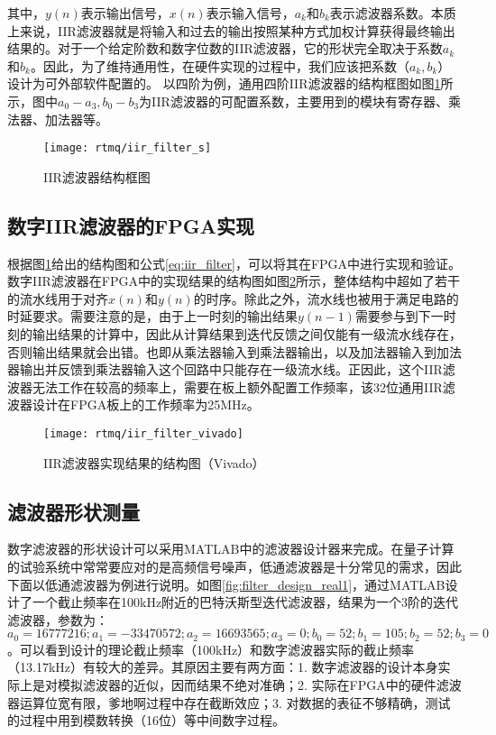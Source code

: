 
其中，$y(n)$表示输出信号，$x(n)$表示输入信号，$a_k$和$b_k$表示滤波器系数。本质上来说，IIR滤波器就是将输入和过去的输出按照某种方式加权计算获得最终输出结果的。对于一个给定阶数和数字位数的IIR滤波器，它的形状完全取决于系数$a_k$和$b_k$。因此，为了维持通用性，在硬件实现的过程中，我们应该把系数（$a_k, b_k$）设计为可外部软件配置的。
以四阶为例，通用四阶IIR滤波器的结构框图如图\ref{fig:iir_filter_s}所示，图中$a_0-a_3, b_0-b_3$为IIR滤波器的可配置系数，主要用到的模块有寄存器、乘法器、加法器等。
\begin{figure}
    \centering
    \caption[IIR滤波器结构框图]{IIR滤波器结构框图\label{fig:iir_filter_s}}
    \texttt{[image: rtmq/iir\_filter\_s]}
\end{figure}


\subsection[数字IIR滤波器的FPGA实现]{数字IIR滤波器的FPGA实现}

根据图\ref{fig:iir_filter_s}给出的结构图和公式\eqref{eq:iir_filter}，可以将其在FPGA中进行实现和验证。数字IIR滤波器在FPGA中的实现结果的结构图如图\ref{fig:iir_filter_vivado}所示，整体结构中超如了若干的流水线用于对齐$x(n)$和$y(n)$的时序。除此之外，流水线也被用于满足电路的时延要求。需要注意的是，由于上一时刻的输出结果$y(n-1)$需要参与到下一时刻的输出结果的计算中，因此从计算结果到迭代反馈之间仅能有一级流水线存在，否则输出结果就会出错。也即从乘法器输入到乘法器输出，以及加法器输入到加法器输出并反馈到乘法器输入这个回路中只能存在一级流水线。正因此，这个IIR滤波器无法工作在较高的频率上，需要在板上额外配置工作频率，该32位通用IIR滤波器设计在FPGA板上的工作频率为25MHz。

\begin{figure}
    \centering
    \caption[IIR滤波器实现结果的结构图]{IIR滤波器实现结果的结构图（Vivado）\label{fig:iir_filter_vivado}}
    \texttt{[image: rtmq/iir\_filter\_vivado]}
\end{figure}




\subsection[滤波器形状测量]{滤波器形状测量}
数字滤波器的形状设计可以采用MATLAB中的滤波器设计器来完成。在量子计算的试验系统中常常要应对的是高频信号噪声，低通滤波器是十分常见的需求，因此下面以低通滤波器为例进行说明。如图\ref{fig:filter_design_real1}，通过MATLAB设计了一个截止频率在100kHz附近的巴特沃斯型迭代滤波器，结果为一个3阶的迭代滤波器，参数为：$a_0=16777216;
a_1=-33470572;
a_2=16693565;
a_3=0;
b_0=52;
b_1=105;
b_2=52;
b_3=0$。可以看到设计的理论截止频率（100kHz）和数字滤波器实际的截止频率（13.17kHz）有较大的差异。其原因主要有两方面：1. 数字滤波器的设计本身实际上是对模拟滤波器的近似，因而结果不绝对准确；2. 实际在FPGA中的硬件滤波器运算位宽有限，爹地啊过程中存在截断效应；3. 对数据的表征不够精确，测试的过程中用到模数转换（16位）等中间数字过程。

